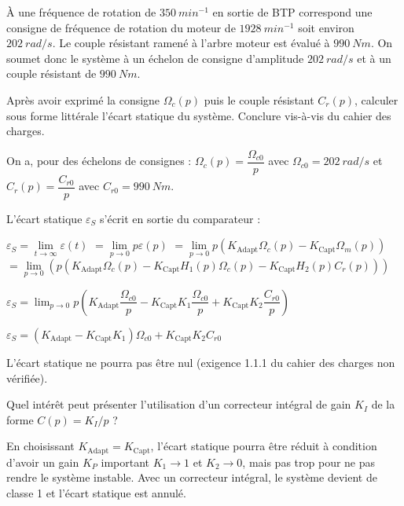 À une fréquence de rotation de $\SI{350}{min^{-1}}$ en sortie de BTP correspond une consigne de fréquence de rotation du moteur de $\SI{1 928}{min^{-1}}$ soit environ $\SI{202}{rad/s}$. Le couple résistant ramené à l'arbre moteur est évalué à $\SI{990}{Nm}$. On soumet donc le système à un échelon de consigne d'amplitude $\SI{202}{rad/s}$ et à un couple résistant de $\SI{990}{Nm}$.

\begin{question}
Après avoir exprimé la consigne  $\Omega_c (p)$ puis le couple résistant $C_r (p)$, calculer sous forme littérale l'écart statique du système. Conclure vis-à-vis du cahier des charges.
\end{question}

\ifprof
\begin{corrige}

On a, pour des échelons de consignes :
$\Omega_c (p)=\dfrac{\Omega_{c0}}{p}$	avec $\Omega_{c0}=\SI{202}{rad/s}$	et	$C_r (p)=\dfrac{C_{r0}}{p}$	avec $C_{r0}=\SI{990}{N m}$.

L’écart statique $\varepsilon_S$  s’écrit en sortie du comparateur :

$\varepsilon_S= \lim\limits_{t\to \infty} \varepsilon(t)$  
$=\lim\limits_{p\to 0} p \varepsilon(p)$
$=\lim\limits_{p\to0} p (K_{\text{Adapt}}\Omega_c (p)-K_{\text{Capt}} \Omega_m (p))$
$=\lim\limits_{p\to 0}  \left(p (K_{\text{Adapt}} \Omega_c (p)-K_{\text{Capt}} H_1 (p) \Omega_c (p)-K_{\text{Capt}} H_2 (p) C_r (p))\right)$

$\varepsilon_S=\lim_{p\to 0}  p \left(K_{\text{Adapt}} \dfrac{\Omega_{c0}}{p}-K_{\text{Capt}} K_1 \dfrac{\Omega_{c0}}{p}+K_{\text{Capt}} K_2 \dfrac{C_{r0}}{p}\right)$

$\varepsilon_S=\left(K_{\text{Adapt}}-K_{\text{Capt}} K_1 \right)\Omega_{c0}+ K_{\text{Capt}} K_2C_{r0}$

L’écart statique ne pourra pas être nul (exigence 1.1.1 du cahier des charges non vérifiée).


\end{corrige}
\else
\fi


\begin{question}
Quel intérêt peut présenter l'utilisation d'un correcteur intégral de gain $K_I$ de la forme $C(p)=K_I/p$ ?
\end{question}

\ifprof
\begin{corrige}
En choisissant $K_{\text{Adapt}}=K_{\text{Capt}}$, l’écart statique pourra être réduit à condition d’avoir un gain $K_P$ important $K_1\to 1$ et $K_2\to 0$, mais pas trop pour ne pas rendre le système instable.
Avec un correcteur intégral, le système devient de classe 1 et l’écart statique est annulé.
\end{corrige}
\else
\fi


